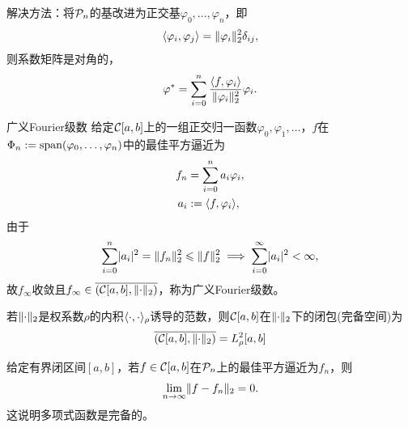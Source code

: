 \begin{remark}
    解决方法：将$\mathcal{P}_n$的基改进为正交基$\varphi_0,\ldots,\varphi_n$，即
    \begin{equation}\label{eq:na-orthogonal-family}
        \langle\varphi_i,\varphi_j\rangle = \lVert\varphi_i\rVert_2^2\delta_{ij},
    \end{equation}
    则系数矩阵是对角的，
    \begin{equation}
        \varphi^* = \sum_{i=0}^n\frac{\langle f,\varphi_i\rangle}{\lVert\varphi_i\rVert_2^2}\varphi_i.
    \end{equation}
\end{remark}

\begin{definition}
    {广义Fourier级数}{}
    给定$\mathcal{C}[a,b]$上的一组正交归一函数$\varphi_0,\varphi_1,\ldots$，$f$在$\Phi_n := \operatorname{span}(\varphi_0,\ldots,\varphi_n)$中的最佳平方逼近为
    \begin{subequations}\label{eq:na-orthogonal-projection-coefficients}
        \begin{align}
            f_n &= \sum_{i=0}^na_i\varphi_i,\\
            a_i &:= \langle f,\varphi_i\rangle,
        \end{align}
    \end{subequations}
    由于
    \begin{equation}\label{eq:na-bessel-inequality}
        \sum_{i=0}^n\lvert a_i\rvert^2 = \lVert f_n\rVert_2^2 \leqslant \lVert f\rVert_2^2 \implies \sum_{i=0}^\infty\lvert a_i\rvert^2 < \infty,
    \end{equation}
    故$f_\infty$收敛且$f_\infty \in \overline{(\mathcal{C}[a,b],\lVert\cdot\rVert_2)}$，称为广义Fourier级数。
\end{definition}

\begin{remark}
    若$\lVert\cdot\rVert_2$是权系数$\rho$的内积$\langle\cdot,\cdot\rangle_\rho$诱导的范数，则$\mathcal{C}[a,b]$在$\lVert\cdot\rVert_2$下的闭包(完备空间)为
    \begin{equation}
        \overline{(\mathcal{C}[a,b],\lVert\cdot\rVert_2)} = L^2_\rho[a,b]
    \end{equation}
\end{remark}

\begin{theorem}
    {}{}
    给定有界闭区间$[a,b]$，若$f \in \mathcal{C}[a,b]$在$\mathcal{P}_n$上的最佳平方逼近为$f_n$，则
    \begin{equation}
        \lim_{n\to\infty}\lVert f - f_n\rVert_2 = 0.
    \end{equation}
    这说明多项式函数是完备的。
\end{theorem}

